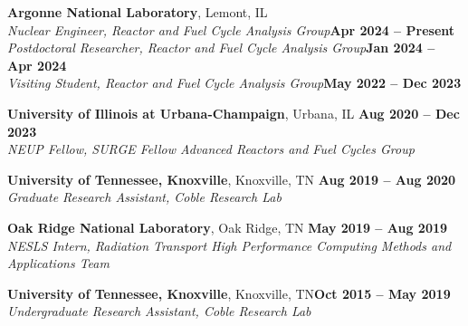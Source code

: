 \documentclass[margin,line]{resume}
\begin{document}
\begin{resume}
    \textbf{Argonne National Laboratory}, Lemont, IL\\
    \vspace{0mm}
        \textsl{Nuclear Engineer, Reactor and Fuel Cycle Analysis Group}\hfill\textbf{Apr 2024 -- Present}\\\vspace{0mm}
        \textsl{Postdoctoral Researcher, Reactor and Fuel Cycle Analysis Group}\hfill\textbf{Jan 2024 -- Apr 2024}\\\vspace{-2mm}
        \textsl{Visiting Student, Reactor and Fuel Cycle Analysis Group}\hfill\textbf{May 2022 -- Dec 2023}\\\vspace{-6mm}

    \textbf{University of Illinois at Urbana-Champaign}, Urbana, IL \hfill \textbf{Aug 2020 -- Dec 2023} \\
    \vspace{-6mm}
        \textsl{NEUP Fellow, SURGE Fellow Advanced Reactors and Fuel Cycles Group} \\\vspace{-2mm}
        
    \textbf{University of Tennessee, Knoxville}, Knoxville, TN \hfill \textbf{Aug 2019 -- Aug 2020}\\
    \vspace{-6mm}
        \textsl{Graduate Research Assistant, Coble Research Lab} \\ \vspace{-2mm}
    
    \textbf{Oak Ridge National Laboratory}, Oak Ridge, TN \hfill \textbf{May 2019 -- Aug 2019}\\
    \vspace{-6mm}        
        \textsl{NESLS Intern, Radiation Transport High Performance Computing Methods and Applications Team}\\ \vspace{-2mm}              
    
    \textbf{University of Tennessee, Knoxville}, Knoxville, TN\hfill\textbf{Oct 2015 -- May 2019}\\
    \vspace{-6mm}            
        \textsl{Undergraduate Research Assistant, Coble Research Lab}\\\vspace{-1mm}

    

\end{resume}
\end{document}
